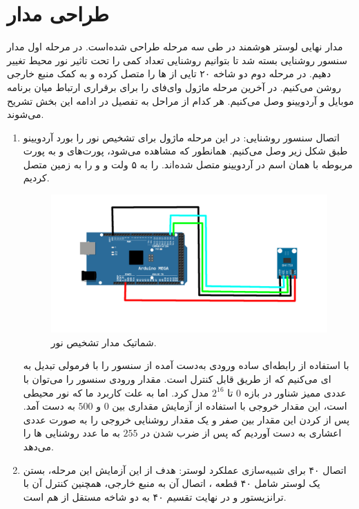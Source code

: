 \documentclass[12pt,a4paper]{article}
\begin{document}
	
	\section{طراحی مدار}
	مدار نهایی لوستر هوشمند در طی سه مرحله طراحی شده‌است. در مرحله اول مدار سنسور روشنایی بسته شد تا بتوانیم روشنایی تعداد کمی  را تحت تاثیر نور محیط تغییر دهیم. در مرحله دوم دو شاخه ۲۰ تایی از  ها را متصل کرده و به کمک منبع خارجی روشن می‌کنیم. در آخرین مرحله ماژول وای‌فای را برای برقراری ارتباط میان برنامه موبایل و آردویینو وصل می‌کنیم. هر کدام از مراحل به تفصیل در ادامه این بخش تشریح می‌شوند.
	
	\begin{enumerate}
\item اتصال سنسور روشنایی:
در این مرحله ماژول 
برای تشخیص نور را بورد آردویینو طبق شکل زیر وصل می‌کنیم. همانطور که مشاهده می‌شود، پورت‌های
و
به پورت مربوطه با همان اسم در آردویینو متصل شده‌اند. 
را به ۵ ولت و 
و
را به زمین متصل کردیم.
 \begin{figure}[H]
	\centering
	\includegraphics[scale=0.25]{figs/schema.jpg}
	\caption{
		شماتیک مدار تشخیص نور.
	}
	\label{madar}
\end{figure}

با استفاده از رابطه‌ای ساده ورودی به‌دست آمده از سنسور را با فرمولی تبدیل به 
ای می‌کنیم که از طریق 
قابل کنترل است. مقدار ورودی سنسور را می‌توان با عددی ممیز شناور در بازه $0$ تا 
$2^{16}$
مدل کرد. اما به علت کاربرد ما که نور محیطی است، این مقدار خروجی با استفاده از آزمایش مقداری بین $0$ و 
$500$
به دست آمد. پس از 
کردن این مقدار بین صفر و یک مقدار روشنایی خروجی را به صورت عددی اعشاری به دست آوردیم که پس از ضرب شدن در 
$255$
به ما عدد روشنایی 
ها را می‌دهد. 

\item 
اتصال ۴۰  برای شبیه‌سازی عملکرد لوستر:
هدف از این آزمایش این مرحله، بستن یک لوستر شامل ۴۰ قطعه ، اتصال آن به منبع خارجی، همچنین کنترل آن با ترانزیستور و در نهایت تقسیم ۴۰  به دو شاخه مستقل از هم است.


\end{enumerate}
\end{document}
